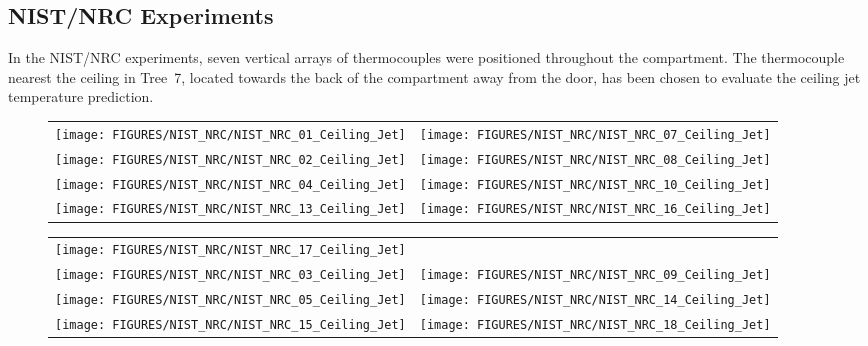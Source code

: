 \clearpage

\subsection{NIST/NRC Experiments}

In the NIST/NRC experiments, seven vertical arrays of thermocouples were positioned throughout the compartment. 
The thermocouple nearest the ceiling in Tree~7, located towards the back of the compartment away from the door,
has been chosen to evaluate the ceiling jet temperature prediction.



\begin{figure}[p]
\begin{tabular*}{\textwidth}{l@{\extracolsep{\fill}}r}
\texttt{[image: FIGURES/NIST\_NRC/NIST\_NRC\_01\_Ceiling\_Jet]} &
\texttt{[image: FIGURES/NIST\_NRC/NIST\_NRC\_07\_Ceiling\_Jet]} \\
\texttt{[image: FIGURES/NIST\_NRC/NIST\_NRC\_02\_Ceiling\_Jet]} &
\texttt{[image: FIGURES/NIST\_NRC/NIST\_NRC\_08\_Ceiling\_Jet]} \\
\texttt{[image: FIGURES/NIST\_NRC/NIST\_NRC\_04\_Ceiling\_Jet]} &
\texttt{[image: FIGURES/NIST\_NRC/NIST\_NRC\_10\_Ceiling\_Jet]} \\
\texttt{[image: FIGURES/NIST\_NRC/NIST\_NRC\_13\_Ceiling\_Jet]} &
\texttt{[image: FIGURES/NIST\_NRC/NIST\_NRC\_16\_Ceiling\_Jet]}
\end{tabular*}
\label{NIST_NRC_Jet_Closed}
\end{figure}

\begin{figure}[p]
\begin{tabular*}{\textwidth}{l@{\extracolsep{\fill}}r}
\texttt{[image: FIGURES/NIST\_NRC/NIST\_NRC\_17\_Ceiling\_Jet]} &
 \\
\texttt{[image: FIGURES/NIST\_NRC/NIST\_NRC\_03\_Ceiling\_Jet]} &
\texttt{[image: FIGURES/NIST\_NRC/NIST\_NRC\_09\_Ceiling\_Jet]} \\
\texttt{[image: FIGURES/NIST\_NRC/NIST\_NRC\_05\_Ceiling\_Jet]} &
\texttt{[image: FIGURES/NIST\_NRC/NIST\_NRC\_14\_Ceiling\_Jet]} \\
\texttt{[image: FIGURES/NIST\_NRC/NIST\_NRC\_15\_Ceiling\_Jet]} &
\texttt{[image: FIGURES/NIST\_NRC/NIST\_NRC\_18\_Ceiling\_Jet]}
\end{tabular*}
\label{NIST_NRC_Jet_Open}
\end{figure}



